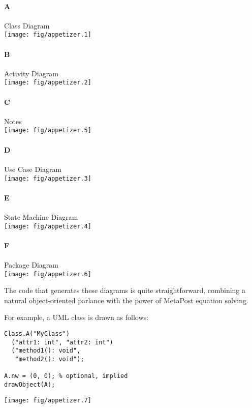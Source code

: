 \documentclass{article}
\begin{document}
\begin{multicols}{2}
\paragraph{A} Class Diagram\\
\texttt{[image: fig/appetizer.1]}
\paragraph{B} Activity Diagram\\
\texttt{[image: fig/appetizer.2]}
\paragraph{C} Notes\\
\texttt{[image: fig/appetizer.5]}
\columnbreak
\paragraph{D} Use Case Diagram\\
\texttt{[image: fig/appetizer.3]}
\paragraph{E} State Machine Diagram\\
\texttt{[image: fig/appetizer.4]}
\paragraph{F} Package Diagram\\
\texttt{[image: fig/appetizer.6]}
\end{multicols}

\pagebreak

The code that generates these diagrams is quite straightforward, combining a natural object-oriented parlance
with the power of MetaPost equation solving.

For example, a UML class is drawn as follows:

\begin{multicols}{2}
\begin{verbatim}
Class.A("MyClass")
  ("attr1: int", "attr2: int")
  ("method1(): void",
   "method2(): void");

A.nw = (0, 0); % optional, implied
drawObject(A);
\end{verbatim}
\columnbreak
\hspace{1cm}\texttt{[image: fig/appetizer.7]}
\end{multicols}
\end{document}
